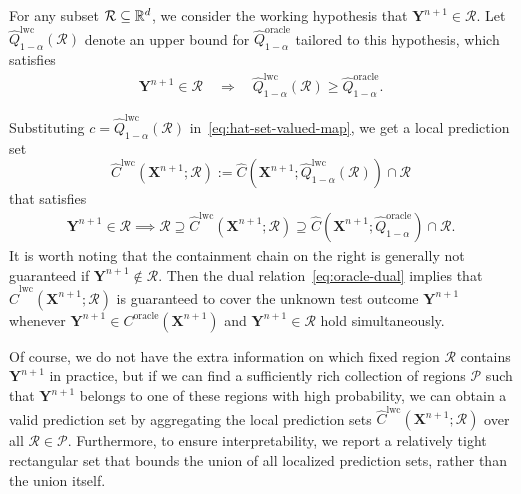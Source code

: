 For any subset $\mathcal{R} \subseteq \mathbb{R}^d$, we consider the working hypothesis that $\mathbf{Y}^{n+1} \in \mathcal{R}$.
Let $\hat{Q}^\mathrm{lwc}_{1-\alpha}(\mathcal{R})$ denote an upper bound for $\hat{Q}^{\mathrm{oracle}}_{1-\alpha}$ tailored to this hypothesis, which satisfies
\begin{align}\label{eq:lwc-upperbound}
  \mathbf{Y}^{n+1} \in \mathcal{R} \quad \Longrightarrow \quad \hat{Q}^\mathrm{lwc}_{1-\alpha}(\mathcal{R}) \geq \hat{Q}^{\mathrm{oracle}}_{1-\alpha}.
\end{align}
{\color{blue}
Substituting $c = \hat{Q}^\mathrm{lwc}_{1-\alpha}(\mathcal{R})$ in~\eqref{eq:hat-set-valued-map}, we get a local prediction set 
\begin{equation}\label{eq:lwc-prediction}
    \hat{C}^\mathrm{lwc} (\mathbf{X}^{n+1}; \mathcal{R}):=\hat{C}(\mathbf{X}^{n+1}; \hat{Q}^\mathrm{lwc}_{1-\alpha}(\mathcal{R})) \cap \mathcal{R}
\end{equation}
that satisfies
\begin{align} \label{eq:lwc-local-containment}
  \mathbf{Y}^{n+1} \in \mathcal{R} \implies \mathcal{R} \supseteq \hat{C}^\mathrm{lwc} (\mathbf{X}^{n+1}; \mathcal{R}) \supseteq \hat{C}(\mathbf{X}^{n+1}; \hat{Q}^{\mathrm{oracle}}_{1-\alpha}) \cap \mathcal{R}.
\end{align}
It is worth noting that the containment chain on the right is generally not guaranteed if $\mathbf{Y}^{n+1} \notin \mathcal{R}$. Then the dual relation~\eqref{eq:oracle-dual} implies that $\hat{C}^\mathrm{lwc} (\mathbf{X}^{n+1}; \mathcal{R})$
is guaranteed to cover the unknown test outcome $\mathbf{Y}^{n+1}$ whenever $\mathbf Y^{n+1} \in C^\mathrm{oracle}(\mathbf{X}^{n+1})$ and $\mathbf{Y}^{n+1} \in \mathcal{R}$ hold simultaneously. 

Of course, we do not have the extra information on which fixed region $\mathcal{R}$ contains $\mathbf{Y}^{n+1}$ in practice, but if we can find a sufficiently rich collection of regions $\mathcal{P}$ such that $\mathbf{Y}^{n+1}$ belongs to one of these regions with high probability, we can obtain a valid prediction set by aggregating the local prediction sets $\hat{C}^\mathrm{lwc}(\mathbf{X}^{n+1}; \mathcal{R})$ over all $\mathcal{R} \in \mathcal{P}$. Furthermore, to ensure interpretability, we report a relatively tight rectangular set that bounds the union of all localized prediction sets, rather than the union itself.

}
